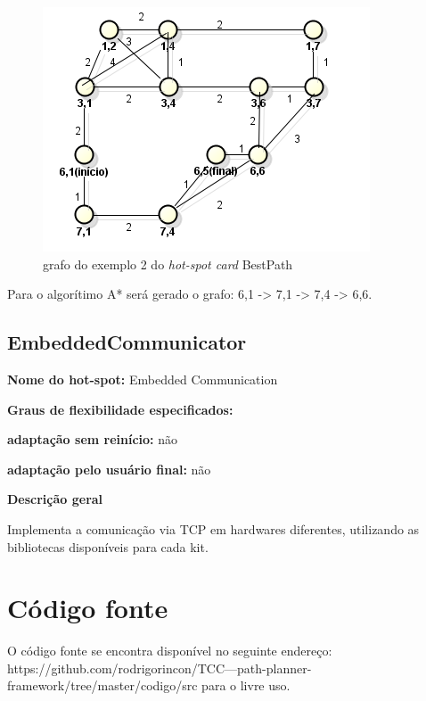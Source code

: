 \begin{anexosenv}
\begin{figure}[H]
	\centering
	\label{figXX3}
		\includegraphics[keepaspectratio=true,scale=0.7]{figuras/grafohotspotcard2.PNG}
	\caption{grafo do exemplo 2 do \textit{hot-spot card} BestPath}
\end{figure}

Para o algorítimo A* será gerado o grafo: 6,1 -> 7,1 -> 7,4 -> 6,6.

\section{EmbeddedCommunicator}

{\large \textbf{Nome do hot-spot:}} Embedded Communication

{\large \textbf{Graus de flexibilidade especificados:}}

\textbf{adaptação sem reinício:} não

\textbf{adaptação pelo usuário final:} não

{\large \textbf{Descrição geral}}

Implementa a comunicação via TCP em hardwares diferentes, utilizando as bibliotecas disponíveis para cada kit.

\chapter{Código fonte}

O código fonte se encontra disponível no seguinte endereço: https://github.com/rodrigorincon/TCC---path-planner-framework/tree/master/codigo/src para o livre uso.

\end{anexosenv}

